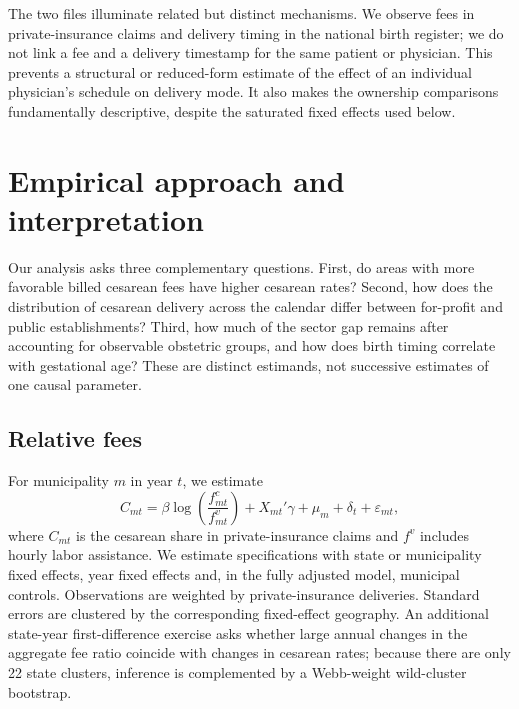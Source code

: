 \documentclass[12pt]{article}
\begin{document}
The two files illuminate related but distinct mechanisms. We observe fees in private-insurance claims and delivery timing in the national birth register; we do not link a fee and a delivery timestamp for the same patient or physician. This prevents a structural or reduced-form estimate of the effect of an individual physician's schedule on delivery mode. It also makes the ownership comparisons fundamentally descriptive, despite the saturated fixed effects used below.

\section{Empirical approach and interpretation}\label{sec:strategy}
Our analysis asks three complementary questions. First, do areas with more favorable billed cesarean fees have higher cesarean rates? Second, how does the distribution of cesarean delivery across the calendar differ between for-profit and public establishments? Third, how much of the sector gap remains after accounting for observable obstetric groups, and how does birth timing correlate with gestational age? These are distinct estimands, not successive estimates of one causal parameter.

\subsection{Relative fees}

For municipality $m$ in year $t$, we estimate
\begin{equation}
C_{mt}=\beta\log\left(\frac{f^c_{mt}}{f^v_{mt}}\right)+X_{mt}'\gamma+\mu_m+\delta_t+\varepsilon_{mt},
\label{eq:feegap}
\end{equation}
where \(C_{mt}\) is the cesarean share in private-insurance claims and \(f^v\) includes hourly labor assistance. We estimate specifications with state or municipality fixed effects, year fixed effects and, in the fully adjusted model, municipal controls. Observations are weighted by private-insurance deliveries. Standard errors are clustered by the corresponding fixed-effect geography. An additional state-year first-difference exercise asks whether large annual changes in the aggregate fee ratio coincide with changes in cesarean rates; because there are only 22 state clusters, inference is complemented by a Webb-weight wild-cluster bootstrap.
\end{document}
